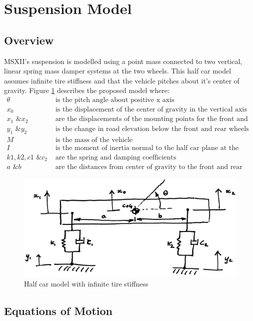 \documentclass[12pt]{article}
\begin{document}
\section{Suspension Model}
\subsection{Overview}
MSXII's suspension is modelled using a point mass connected to two vertical, linear spring mass damper systems at the two wheels. This half car model assumes infinite tire stiffness and that the vehicle pitches about it's center of gravity. Figure \ref{fig:systemModel} describes the proposed model where: 
\begin{align*}
	\theta & \text{ is the pitch angle about positive x axis}\\        
	x_0 & \text{ is the displacement of the center of gravity in the vertical axis} \\
	x_1 \text{ \& } x_2 & \text{ are the displacements of the mounting points for the front and rear wheels respectively} \\
	y_1 \text{ \& } y_2 & \text{ is the change in road elevation below the front  and rear wheels respectively} \\
	M & \text{ is the mass of the vehicle} \\
	I & \text{ is the moment of inertia normal to the half car plane at the center of gravity} \\
	k1,k2,c1 \text{ \& } c_2 & \text{ are the spring and damping coefficients} \\
	a \text{ \& } b & \text{ are the distances from center of gravity to the front and rear wheels respectively}
\end{align*}
\begin{figure}[h!]
	\centering
	\includegraphics[width=.8\textwidth]{./LaTex/systemModel.jpg}
	\caption{Half car model with infinite tire stiffness}
	\label{fig:systemModel}
\end{figure}

\subsection{Equations of Motion}
\end{document}
